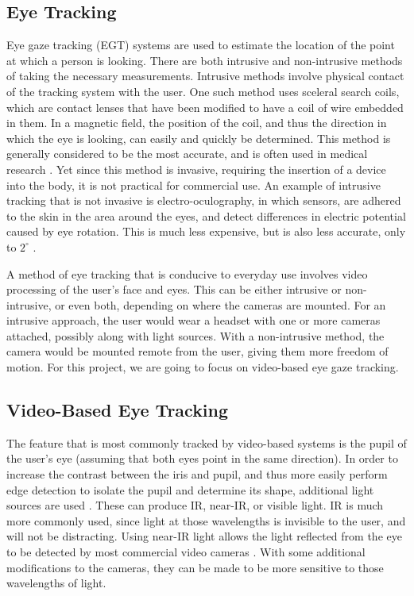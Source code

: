 \documentclass[12pt,conference,onecolumn]{IEEEtran}
\begin{document}
\subsection{Eye Tracking}
Eye gaze tracking (EGT) systems are used to estimate the location of the point at which a person is looking. There are both intrusive and non-intrusive methods of taking the necessary measurements. Intrusive methods involve physical contact of the tracking system with the user. One such method uses sceleral search coils, which are contact lenses that have been modified to have a coil of wire embedded in them. In a magnetic field, the position of the coil, and thus the direction in which the eye is looking, can easily and quickly be determined. This method is generally considered to be the most accurate, and is often used in medical research \cite{chennamma}. Yet since this method is invasive, requiring the insertion of a device into the body, it is not practical for commercial use. An example of intrusive tracking that is not invasive is electro-oculography, in which sensors, are adhered to the skin in the area around the eyes, and detect differences in electric potential caused by eye rotation. This is much less expensive, but is also less accurate, only to $2^{\circ}$ \cite{morimoto}.

A method of eye tracking that is conducive to everyday use involves video processing of the user's face and eyes. This can be either intrusive or non-intrusive, or even both, depending on where the cameras are mounted. For an intrusive approach, the user would wear a headset with one or more cameras attached, possibly along with light sources. With a non-intrusive method, the camera would be mounted remote from the user, giving them more freedom of motion. For this project, we are going to focus on video-based eye gaze tracking.

\subsection{Video-Based Eye Tracking}
The feature that is most commonly tracked by video-based systems is the pupil of the user's eye (assuming that both eyes point in the same direction). In order to increase the contrast between the iris and pupil, and thus more easily perform edge detection to isolate the pupil and determine its shape, additional light sources are used . These can produce IR, near-IR, or visible light. IR is much more commonly used, since light at those wavelengths is invisible to the user, and will not be distracting. Using near-IR light allows the light reflected from the eye to be detected by most commercial video cameras \cite{morimoto}. With some additional modifications to the cameras, they can be made to be more sensitive to those wavelengths of light. 
\end{document}
